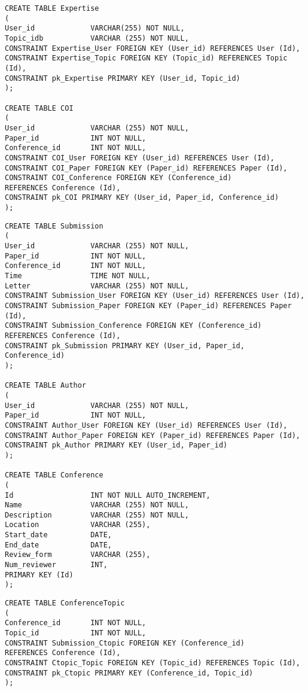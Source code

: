 \documentclass[12pt]{article}
\newcommand{\<}{\langle}
\renewcommand{\>}{\rangle}
\begin{document}
\begin{verbatim}
CREATE TABLE Expertise
(
User_id             VARCHAR(255) NOT NULL,
Topic_idb           VARCHAR (255) NOT NULL,
CONSTRAINT Expertise_User FOREIGN KEY (User_id) REFERENCES User (Id),
CONSTRAINT Expertise_Topic FOREIGN KEY (Topic_id) REFERENCES Topic (Id),
CONSTRAINT pk_Expertise PRIMARY KEY (User_id, Topic_id)
);

CREATE TABLE COI
(
User_id             VARCHAR (255) NOT NULL,
Paper_id            INT NOT NULL,
Conference_id       INT NOT NULL,
CONSTRAINT COI_User FOREIGN KEY (User_id) REFERENCES User (Id),
CONSTRAINT COI_Paper FOREIGN KEY (Paper_id) REFERENCES Paper (Id),
CONSTRAINT COI_Conference FOREIGN KEY (Conference_id) 
REFERENCES Conference (Id),
CONSTRAINT pk_COI PRIMARY KEY (User_id, Paper_id, Conference_id)
);
\end{verbatim}
\pagebreak
\begin{verbatim}
CREATE TABLE Submission
(
User_id             VARCHAR (255) NOT NULL,
Paper_id            INT NOT NULL,
Conference_id       INT NOT NULL,
Time                TIME NOT NULL,
Letter              VARCHAR (255) NOT NULL,
CONSTRAINT Submission_User FOREIGN KEY (User_id) REFERENCES User (Id),
CONSTRAINT Submission_Paper FOREIGN KEY (Paper_id) REFERENCES Paper (Id),
CONSTRAINT Submission_Conference FOREIGN KEY (Conference_id) 
REFERENCES Conference (Id),
CONSTRAINT pk_Submission PRIMARY KEY (User_id, Paper_id, Conference_id)
);

CREATE TABLE Author
(
User_id             VARCHAR (255) NOT NULL,
Paper_id            INT NOT NULL,
CONSTRAINT Author_User FOREIGN KEY (User_id) REFERENCES User (Id),
CONSTRAINT Author_Paper FOREIGN KEY (Paper_id) REFERENCES Paper (Id),
CONSTRAINT pk_Author PRIMARY KEY (User_id, Paper_id)
);

CREATE TABLE Conference
(
Id                  INT NOT NULL AUTO_INCREMENT,
Name                VARCHAR (255) NOT NULL,
Description         VARCHAR (255) NOT NULL,
Location            VARCHAR (255),
Start_date          DATE,
End_date            DATE,
Review_form         VARCHAR (255),
Num_reviewer        INT,
PRIMARY KEY (Id)
);
\end{verbatim}
\pagebreak
\begin{verbatim}
CREATE TABLE ConferenceTopic
(
Conference_id       INT NOT NULL,
Topic_id            INT NOT NULL,
CONSTRAINT Submission_Ctopic FOREIGN KEY (Conference_id)
REFERENCES Conference (Id),
CONSTRAINT Ctopic_Topic FOREIGN KEY (Topic_id) REFERENCES Topic (Id),
CONSTRAINT pk_Ctopic PRIMARY KEY (Conference_id, Topic_id)
);
\end{verbatim}
\end{document}
